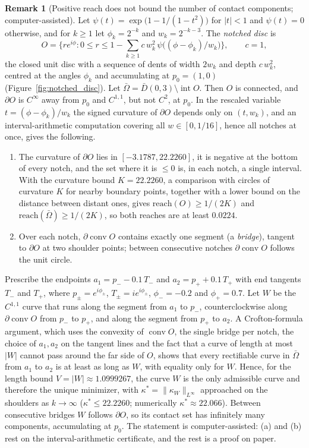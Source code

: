 \documentclass[11pt,reqno]{amsart}
\theoremstyle{definition}
\newtheorem{remark}[theorem]{Remark}
\newcommand{\reach}{\mathrm{reach}}
\numberwithin{equation}{section}
\begin{document}
\begin{remark}[Positive reach does not bound the number of contact components; computer-assisted]
\label{rem:notched_disc}
Let $\psi(t) = \exp\big(1 - 1/(1 - t^2)\big)$ for $|t| < 1$ and $\psi(t) = 0$ otherwise, and for $k \ge 1$ let $\phi_k = 2^{-k}$ and $w_k = 2^{-k-3}$. The \emph{notched disc} is
\[
O = \Big\{ r e^{i\phi} : 0 \le r \le 1 - \sum_{k \ge 1} c\, w_k^2\, \psi\big((\phi - \phi_k)/w_k\big) \Big\}, \qquad c = 1,
\]
the closed unit disc with a sequence of dents of width $2w_k$ and depth $c\,w_k^2$, centred at the angles $\phi_k$ and accumulating at $p_0 = (1,0)$ (Figure~\ref{fig:notched_disc}). Let $\bar\Omega = \bar D(0,3) \setminus \operatorname{int} O$. Then $O$ is connected, and $\partial O$ is $C^\infty$ away from $p_0$ and $C^{1,1}$, but not $C^2$, at $p_0$. In the rescaled variable $t = (\phi - \phi_k)/w_k$ the signed curvature of $\partial O$ depends only on $(t, w_k)$, and an interval-arithmetic computation covering all $w \in [0, 1/16]$, hence all notches at once, gives the following.
\begin{enumerate}
    \item[(a)] The curvature of $\partial O$ lies in $[-3.1787, 22.2260]$, it is negative at the bottom of every notch, and the set where it is $\le 0$ is, in each notch, a single interval. With the curvature bound $K = 22.2260$, a comparison with circles of curvature $K$ for nearby boundary points, together with a lower bound on the distance between distant ones, gives $\reach(O) \ge 1/(2K)$ and $\reach(\bar\Omega) \ge 1/(2K)$, so both reaches are at least $0.0224$.
    \item[(b)] Over each notch, $\partial\operatorname{conv} O$ contains exactly one segment (a \emph{bridge}), tangent to $\partial O$ at two shoulder points; between consecutive notches $\partial\operatorname{conv} O$ follows the unit circle.
\end{enumerate}
Prescribe the endpoints $a_1 = p_- - 0.1\,T_-$ and $a_2 = p_+ + 0.1\,T_+$ with end tangents $T_-$ and $T_+$, where $p_\pm = e^{i\phi_\pm}$, $T_\pm = i e^{i\phi_\pm}$, $\phi_- = -0.2$ and $\phi_+ = 0.7$. Let $W$ be the $C^{1,1}$ curve that runs along the segment from $a_1$ to $p_-$, counterclockwise along $\partial\operatorname{conv} O$ from $p_-$ to $p_+$, and along the segment from $p_+$ to $a_2$. A Crofton-formula argument, which uses the convexity of $\operatorname{conv} O$, the single bridge per notch, the choice of $a_1, a_2$ on the tangent lines and the fact that a curve of length at most $|W|$ cannot pass around the far side of $O$, shows that every rectifiable curve in $\bar\Omega$ from $a_1$ to $a_2$ is at least as long as $W$, with equality only for $W$. Hence, for the length bound $V = |W| \approx 1.0999267$, the curve $W$ is the only admissible curve and therefore the unique minimizer, with $\kappa^* = \|\kappa_W\|_{L^\infty}$ approached on the shoulders as $k \to \infty$ ($\kappa^* \le 22.2260$; numerically $\kappa^* \approx 22.066$). Between consecutive bridges $W$ follows $\partial O$, so its contact set has infinitely many components, accumulating at $p_0$. The statement is computer-assisted: (a) and (b) rest on the interval-arithmetic certificate, and the rest is a proof on paper.


\end{remark}
\end{document}
